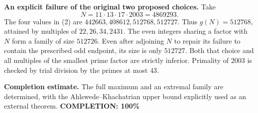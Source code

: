 \textbf{An explicit failure of the original two proposed choices.}
Take
\[
 N=11\cdot13\cdot17\cdot2003=4869293.
\]
The four values in (2) are $442663,408612,512768,512727$. Thus $g(N)=512768$, attained by multiples of $22,26,34,2431$.
The even integers sharing a factor with $N$ form a family of size $512726$. Even after adjoining $N$ to repair its failure to contain the prescribed odd endpoint, its size is only $512727$. Both that choice and all multiples of the smallest prime factor are strictly inferior. Primality of $2003$ is checked by trial division by the primes at most $43$.

\textbf{Completion estimate.}
The full maximum and an extremal family are determined, with the Ahlswede--Khachatrian upper bound explicitly used as an external theorem.
\textbf{COMPLETION: 100\%}
